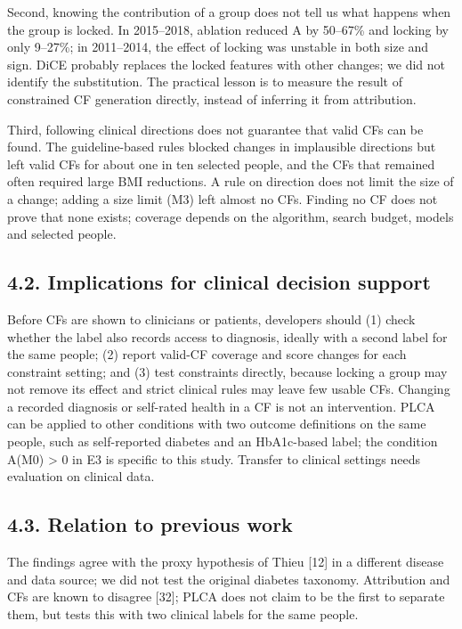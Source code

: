 \documentclass[
  11pt,
]{article}
\begin{document}
Second, knowing the contribution of a group does not tell us what
happens when the group is locked. In 2015--2018, ablation reduced
\textbar A\textbar{} by 50--67\% and locking by only 9--27\%; in
2011--2014, the effect of locking was unstable in both size and sign.
DiCE probably replaces the locked features with other changes; we did
not identify the substitution. The practical lesson is to measure the
result of constrained CF generation directly, instead of inferring it
from attribution.

Third, following clinical directions does not guarantee that valid CFs
can be found. The guideline-based rules blocked changes in implausible
directions but left valid CFs for about one in ten selected people, and
the CFs that remained often required large BMI reductions. A rule on
direction does not limit the size of a change; adding a size limit (M3)
left almost no CFs. Finding no CF does not prove that none exists;
coverage depends on the algorithm, search budget, models and selected
people.

\subsection{4.2. Implications for clinical decision support}

Before CFs are shown to clinicians or patients, developers should (1)
check whether the label also records access to diagnosis, ideally with a
second label for the same people; (2) report valid-CF coverage and score
changes for each constraint setting; and (3) test constraints directly,
because locking a group may not remove its effect and strict clinical
rules may leave few usable CFs. Changing a recorded diagnosis or
self-rated health in a CF is not an intervention. PLCA can be applied to
other conditions with two outcome definitions on the same people, such
as self-reported diabetes and an HbA1c-based label; the condition A(M0)
\textgreater{} 0 in E3 is specific to this study. Transfer to clinical
settings needs evaluation on clinical data.

\subsection{4.3. Relation to previous work}

The findings agree with the proxy hypothesis of Thieu {[}12{]} in a
different disease and data source; we did not test the original diabetes
taxonomy. Attribution and CFs are known to disagree {[}32{]}; PLCA does
not claim to be the first to separate them, but tests this with two
clinical labels for the same people.
\end{document}
